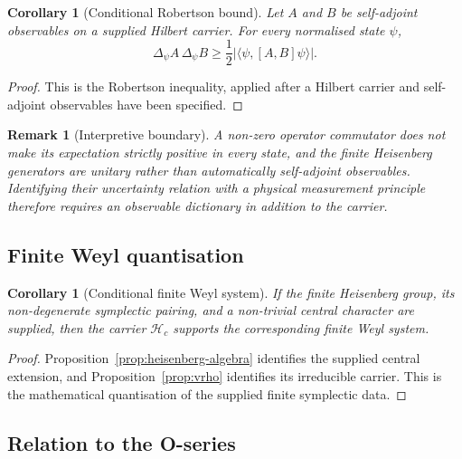 \documentclass[11pt,a4paper]{article}
\newtheorem{corollary}[theorem]{Corollary}
\newtheorem{remark}[theorem]{Remark}
\begin{document}
    \begin{corollary}[Conditional Robertson bound]
      \label{cor:uncertainty}
      Let $A$ and $B$ be self-adjoint observables on a supplied Hilbert carrier.
      For every normalised state $\psi$,
      \[
        \Delta_\psi A\,\Delta_\psi B
        \geq \frac{1}{2}\bigl|\langle\psi,[A,B]\psi\rangle\bigr|.
      \]
    \end{corollary}

    \begin{proof}
      This is the Robertson inequality, applied after a Hilbert carrier and
      self-adjoint observables have been specified.
    \end{proof}

    \begin{remark}[Interpretive boundary]
      \label{rem:uncertainty-interpretation}
      A non-zero operator commutator does not make its expectation strictly
      positive in every state, and the finite Heisenberg generators are unitary
      rather than automatically self-adjoint observables.
      Identifying their uncertainty relation with a physical measurement
      principle therefore requires an observable dictionary in addition to the
      carrier.
    \end{remark}

  \subsection{Finite Weyl quantisation}

    \begin{corollary}[Conditional finite Weyl system]
      \label{cor:quantisation}
      If the finite Heisenberg group, its non-degenerate symplectic pairing, and
      a non-trivial central character are supplied, then the carrier
      $\mathcal{H}_c$ supports the corresponding finite Weyl system.
    \end{corollary}

    \begin{proof}
      Proposition~\ref{prop:heisenberg-algebra} identifies the supplied central
      extension, and Proposition~\ref{prop:vrho} identifies its irreducible
      carrier.
      This is the mathematical quantisation of the supplied finite symplectic
      data.
    \end{proof}

  \subsection{Relation to the O-series}
\end{document}
